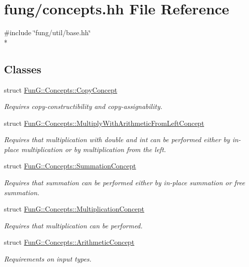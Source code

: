 \hypertarget{concepts_8hh}{\section{fung/concepts.hh File Reference}
\label{concepts_8hh}
}
{\ttfamily \#include \char`\"{}fung/util/base.\-hh\char`\"{}}\\*
\subsection*{Classes}
\begin{DoxyCompactItemize}
\item 
struct \hyperlink{structFunG_1_1Concepts_1_1CopyConcept}{Fun\-G\-::\-Concepts\-::\-Copy\-Concept}
\begin{DoxyCompactList}\small\item\em Requires copy-\/constructibility and copy-\/assignability. \end{DoxyCompactList}\item 
struct \hyperlink{structFunG_1_1Concepts_1_1MultiplyWithArithmeticFromLeftConcept}{Fun\-G\-::\-Concepts\-::\-Multiply\-With\-Arithmetic\-From\-Left\-Concept}
\begin{DoxyCompactList}\small\item\em Requires that multiplication with double and int can be performed either by in-\/place multiplication or by multiplication from the left. \end{DoxyCompactList}\item 
struct \hyperlink{structFunG_1_1Concepts_1_1SummationConcept}{Fun\-G\-::\-Concepts\-::\-Summation\-Concept}
\begin{DoxyCompactList}\small\item\em Requires that summation can be performed either by in-\/place summation or free summation. \end{DoxyCompactList}\item 
struct \hyperlink{structFunG_1_1Concepts_1_1MultiplicationConcept}{Fun\-G\-::\-Concepts\-::\-Multiplication\-Concept}
\begin{DoxyCompactList}\small\item\em Requires that multiplication can be performed. \end{DoxyCompactList}\item 
struct \hyperlink{structFunG_1_1Concepts_1_1ArithmeticConcept}{Fun\-G\-::\-Concepts\-::\-Arithmetic\-Concept}
\begin{DoxyCompactList}\small\item\em Requirements on input types. \end{DoxyCompactList}\item 

\end{DoxyCompactItemize}
